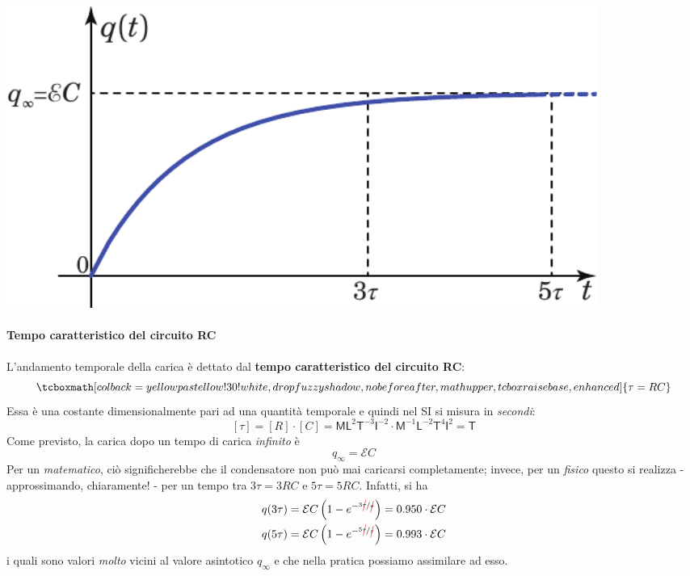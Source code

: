 \begin{center}
	\includegraphics[width=0.85\textwidth]{images/chp5/chp5caricacondgraf1.pdf}
\end{center}
\paragraph{Tempo caratteristico del circuito RC}
L'andamento temporale della carica è dettato dal \textbf{tempo caratteristico del circuito RC}:
\begin{equation}
	\tcboxmath[colback=yellowpastellow!30!white,drop fuzzy shadow, nobeforeafter, math upper, tcbox raise base, enhanced]{\tau=RC}
\end{equation}
Essa è una costante dimensionalmente pari ad una quantità temporale e quindi nel SI si misura in \textit{secondi}:
\begin{equation*}
	\left[\tau\right]=\left[R\right]\cdot\left[C\right]=\mathsf{M} \mathsf{L}^2  \mathsf{T}^{-3}\mathsf{I}^{-2}\cdot\mathsf{M}^{-1}\mathsf{L}^{-2}\mathsf{T}^4\mathsf{I}^2=\mathsf{T}
\end{equation*}
Come previsto, la carica dopo un tempo di carica \textit{infinito} è
\begin{equation}
	q_{\infty}=\mathcal{E}C
\end{equation}
Per un \textit{matematico}, ciò significherebbe che il condensatore non può mai caricarsi completamente; invece, per un \textit{fisico} questo si realizza - approssimando, chiaramente! - per un tempo tra $3\tau=3RC$ e $5\tau=5RC$. Infatti, si ha
\begin{align*}
q(3\tau)&=\mathcal{E}C\left(1-e^{-\nicefrac{3\Ccancel[red]{\tau}}{\Ccancel[red]{\tau}}}\right)=\num{0.950}\cdot\mathcal{E}C\\
q(5\tau)&=\mathcal{E}C\left(1-e^{-\nicefrac{5\Ccancel[red]{\tau}}{\Ccancel[red]{\tau}}}\right)=\num{0.993}\cdot\mathcal{E}C
\end{align*}
i quali sono valori \textit{molto} vicini al valore asintotico $q_{\infty}$ e che nella pratica possiamo assimilare ad esso.
